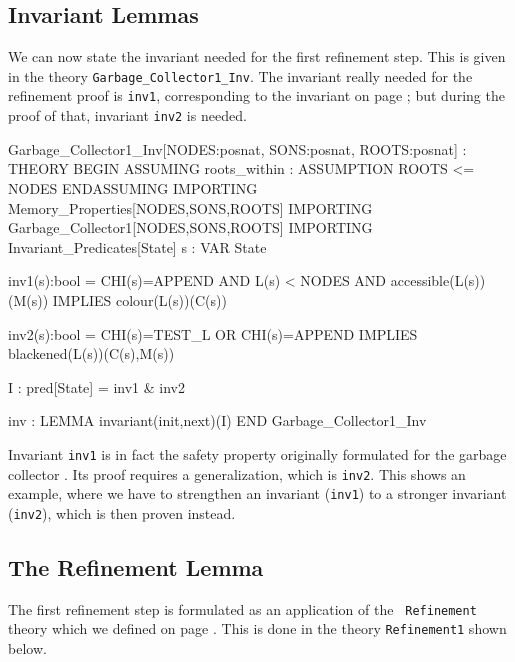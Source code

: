 \subsection{Invariant Lemmas}

We can now state  the invariant needed  for the first refinement step. 
This  is given in  the  theory {\tt Garbage\_Collector1\_Inv}\@.   The
invariant really needed    for the refinement  proof is    {\tt inv1},
corresponding to the invariant on page \pageref{refinement1-inv1}; but
during the proof of that, invariant {\tt inv2} is needed.

\begin{smallsession}
Garbage_Collector1_Inv[NODES:posnat, SONS:posnat, ROOTS:posnat] : THEORY
BEGIN
  ASSUMING
    roots_within : ASSUMPTION ROOTS <= NODES
  ENDASSUMING
  IMPORTING Memory_Properties[NODES,SONS,ROOTS]
  IMPORTING Garbage_Collector1[NODES,SONS,ROOTS]
  IMPORTING Invariant_Predicates[State]
  s : VAR State

  inv1(s):bool =
    CHI(s)=APPEND AND L(s) < NODES AND accessible(L(s))(M(s)) 
      IMPLIES colour(L(s))(C(s))

  inv2(s):bool =
    CHI(s)=TEST_L OR CHI(s)=APPEND IMPLIES blackened(L(s))(C(s),M(s))

  I : pred[State] = inv1 & inv2

  inv : LEMMA invariant(init,next)(I)
END Garbage_Collector1_Inv
\end{smallsession}
\label{invariant-lemmas-refinement1}

Invariant  {\tt inv1} is    in fact  the safety property    originally
formulated   for  the garbage  collector  \cite{Rus:GC}\@.    Its  proof
requires  a  generalization,  which is   {\tt  inv2}\@.   This shows  an
example,  where we have to strengthen  an invariant ({\tt  inv1}) to a
stronger invariant ({\tt inv2}), which is then proven instead.


\subsection{The Refinement Lemma}

The first refinement step is formulated as an  application of the {\tt
  Refinement} theory which we defined  on page \pageref{pvs-mappings}\@. 
This is done in the theory  {\tt Refinement1} shown below.  

